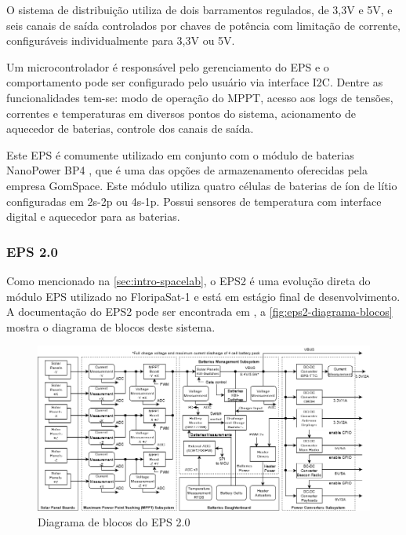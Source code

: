 O sistema de distribuição utiliza de dois barramentos regulados, de 3,3V e 5V, e seis canais de saída controlados por chaves de potência com limitação de corrente, configuráveis individualmente para 3,3V ou 5V.

Um microcontrolador é responsável pelo gerenciamento do \gls{EPS} e o comportamento pode ser configurado pelo usuário via interface \gls{I2C}.
Dentre as funcionalidades tem-se: modo de operação do \gls{MPPT}, acesso aos logs de tensões, correntes e temperaturas em diversos pontos do sistema, acionamento de aquecedor de baterias, controle dos canais de saída.

Este EPS é comumente utilizado em conjunto com o módulo de baterias NanoPower BP4 \cite{bp4-datasheet}, que é uma das opções de armazenamento oferecidas pela empresa GomSpace.
Este módulo utiliza quatro células de baterias de íon de lítio configuradas em 2s-2p ou 4s-1p. Possui sensores de temperatura com interface digital e aquecedor para as baterias.



\subsubsection{EPS 2.0}

Como mencionado na \autoref{sec:intro-spacelab}, o \gls{EPS2} é uma evolução direta do módulo \gls{EPS} utilizado no FloripaSat-1 \cite{floripasat-1} e está em estágio final de desenvolvimento. A documentação do \gls{EPS2} pode ser encontrada em \cite{eps2-doc}, a \autoref{fig:eps2-diagrama-blocos} mostra o diagrama de blocos deste sistema.

\begin{figure}[htp]
    \caption{Diagrama de blocos do EPS 2.0}
    \begin{center}
        \includegraphics[width=\textwidth, keepaspectratio]{images/eps2-power-diagram.png}
    \end{center}
    \label{fig:eps2-diagrama-blocos}
\end{figure}


